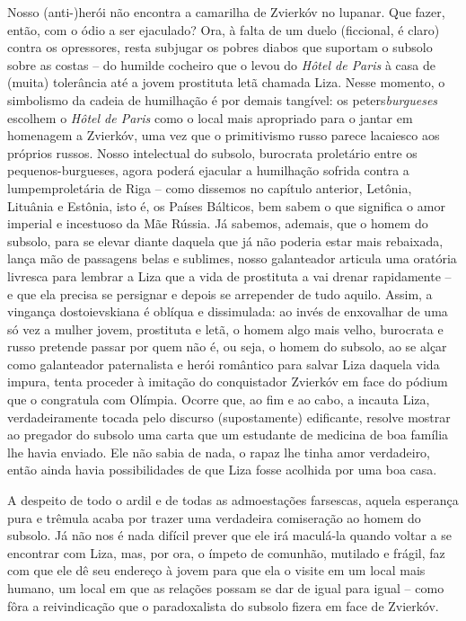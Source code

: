 Nosso (anti-)herói não encontra a camarilha de Zvierkóv no lupanar. Que
fazer, então, com o ódio a ser ejaculado? Ora, à falta de um duelo
(ficcional, é claro) contra os opressores, resta subjugar os pobres
diabos que suportam o subsolo sobre as costas -- do humilde cocheiro que
o levou do \emph{Hôtel de Paris} à casa de (muita) tolerância até a
jovem prostituta letã chamada Liza. Nesse momento, o simbolismo da
cadeia de humilhação é por demais tangível: os peters\emph{burgueses}
escolhem o \emph{Hôtel de Paris} como o local mais apropriado para o
jantar em homenagem a Zvierkóv, uma vez que o primitivismo russo parece
lacaiesco aos próprios russos. Nosso intelectual do subsolo, burocrata
proletário entre os pequenos-burgueses, agora poderá ejacular a
humilhação sofrida contra a lumpemproletária de Riga -- como dissemos no
capítulo anterior, Letônia, Lituânia e Estônia, isto é, os Países
Bálticos, bem sabem o que significa o amor imperial e incestuoso da Mãe
Rússia. Já sabemos, ademais, que o homem do subsolo, para se elevar
diante daquela que já não poderia estar mais rebaixada, lança mão de
passagens belas e sublimes, nosso galanteador articula uma oratória
livresca para lembrar a Liza que a vida de prostituta a vai drenar
rapidamente -- e que ela precisa se persignar e depois se arrepender de
tudo aquilo. Assim, a vingança dostoievskiana é oblíqua e dissimulada:
ao invés de enxovalhar de uma só vez a mulher jovem, prostituta e letã,
o homem algo mais velho, burocrata e russo pretende passar por quem não
é, ou seja, o homem do subsolo, ao se alçar como galanteador
paternalista e herói romântico para salvar Liza daquela vida impura,
tenta proceder à imitação do conquistador Zvierkóv em face do pódium que
o congratula com Olímpia. Ocorre que, ao fim e ao cabo, a incauta Liza,
verdadeiramente tocada pelo discurso (supostamente) edificante, resolve
mostrar ao pregador do subsolo uma carta que um estudante de medicina de
boa família lhe havia enviado. Ele não sabia de nada, o rapaz lhe tinha
amor verdadeiro, então ainda havia possibilidades de que Liza fosse
acolhida por uma boa casa.

A despeito de todo o ardil e de todas as admoestações farsescas, aquela
esperança pura e trêmula acaba por trazer uma verdadeira comiseração ao
homem do subsolo. Já não nos é nada difícil prever que ele irá maculá-la
quando voltar a se encontrar com Liza, mas, por ora, o ímpeto de
comunhão, mutilado e frágil, faz com que ele dê seu endereço à jovem
para que ela o visite em um local mais humano, um local em que as
relações possam se dar de igual para igual -- como fôra a reivindicação
que o paradoxalista do subsolo fizera em face de Zvierkóv.

